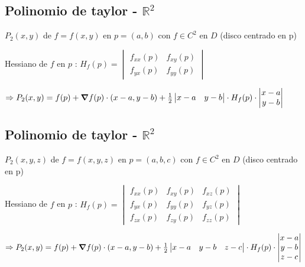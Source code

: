 \documentclass[../practica_05.tex]{subfiles}
\begin{document}
    \subsection*{Polinomio de taylor - $\mathbb{R}^2$}

        $P_2(x,y)$ de $f=f(x,y)$ en $p = (a,b)$ con $f \in C^2$ en $D$ (disco centrado en p)

        Hessiano de $f$ en $p$ : $H_f(p) = \begin{vmatrix}
            f_{xx}(p)   & f_{xy}(p)  \\
            f_{yx}(p)   & f_{yy}(p)  
        \end{vmatrix}$

        $\Rightarrow P_2(x,y) = f(p) + \grad f(p) \cdot (x-a, y-b) + \frac{1}{2} \begin{vmatrix}
            x-a & y-b
        \end{vmatrix} \cdot H_f(p) \cdot \begin{vmatrix}
            x-a \\
            y-b
        \end{vmatrix} $

    \subsection*{Polinomio de taylor - $\mathbb{R}^2$}

        $P_2(x,y,z)$ de $f=f(x,y,z)$ en $p = (a,b,c)$ con $f \in C^2$ en $D$ (disco centrado en p)

        Hessiano de $f$ en $p$ : $H_f(p) = \begin{vmatrix}
            f_{xx}(p)   & f_{xy}(p) & f_{xz}(p) \\
            f_{yx}(p)   & f_{yy}(p) & f_{yz}(p) \\
            f_{zx}(p)   & f_{zy}(p) & f_{zz}(p) 
        \end{vmatrix}$

        $\Rightarrow P_2(x,y) = f(p) + \grad f(p) \cdot (x-a, y-b) + \frac{1}{2} \begin{vmatrix}
            x-a & y-b & z-c
        \end{vmatrix} \cdot H_f(p) \cdot \begin{vmatrix}
            x-a \\
            y-b \\
            z-c
        \end{vmatrix} $
\end{document}
